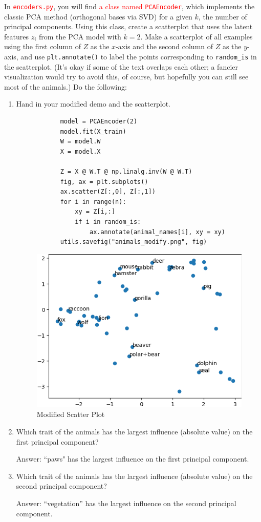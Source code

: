 \documentclass{article}
\newcommand{\red}[1]{\textcolor{red}{#1}}
\newenvironment{answer}{\par\begingroup\color{gre}Answer: }{\endgroup}
\let\update\red
\newenvironment{asking}{\begingroup\color{blu}}{\endgroup}
\begin{document}
In \update{\texttt{encoders.py}}, you will find \update{a class named \texttt{PCAEncoder}}, which implements the classic PCA method (orthogonal bases via SVD) for a given $k$, the number of principal components. Using this class, create a scatterplot that uses the latent features $z_i$ from the PCA model with $k=2$.
Make a scatterplot of all examples using the first column of $Z$ as the $x$-axis and the second column of $Z$ as the $y$-axis, and use \texttt{plt.annotate()} to label the points corresponding to \verb|random_is| in the scatterplot.
(It's okay if some of the text overlaps each other; a fancier visualization would try to avoid this, of course, but hopefully you can still see most of the animals.)
Do the following:
\begin{asking}
	\begin{enumerate}
		\item  Hand in your modified demo and the scatterplot.
		\begin{verbatim}
			model = PCAEncoder(2)
			model.fit(X_train)
			W = model.W
			X = model.X

			Z = X @ W.T @ np.linalg.inv(W @ W.T)
			fig, ax = plt.subplots()
			ax.scatter(Z[:,0], Z[:,1])
			for i in range(n):
				xy = Z[i,:]
				if i in random_is:
					ax.annotate(animal_names[i], xy = xy)
			utils.savefig("animals_modify.png", fig)
		\end{verbatim}

		\begin{figure}[htbp!]
			\centering
			\includegraphics[width = .5\textwidth]{figs/animals_modify.png}
			\caption{Modified Scatter Plot}
		\end{figure}
		\item Which trait of the animals has the largest influence (absolute value) on the first principal component?
		\begin{answer}
			``paws" has the largest influence on the first principal component.
		\end{answer}
		\item Which trait of the animals has the largest influence (absolute value) on the second principal component?
		\begin{answer}
			``vegetation'' has the largest influence on the second principal component.
		\end{answer}
    \end{enumerate}
\end{asking}
\end{document}
